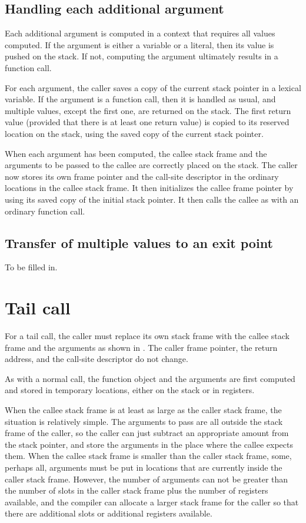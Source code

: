 \subsection{Handling each additional argument}

Each additional argument is computed in a context that requires
all values computed.  If the argument is either a variable or a
literal, then its value is pushed on the stack.  If not, computing the
argument ultimately results in a function call.  

For each argument, the caller saves a copy of the current stack
pointer in a lexical variable.  If the argument is a function call,
then it is handled as usual, and multiple values, except the first
one, are returned on the stack.  The first return value (provided that
there is at least one return value) is copied to its reserved location
on the stack, using the saved copy of the current stack pointer.

When each argument has been computed, the callee stack frame and the
arguments to be passed to the callee are correctly placed on the
stack.  The caller now stores its own frame pointer and the call-site
descriptor in the ordinary locations in the callee stack frame.  It
then initializes the callee frame pointer by using its saved copy of
the initial stack pointer.  It then calls the callee as with an
ordinary function call.

\subsection{Transfer of multiple values to an exit point}

To be filled in.

\section{Tail call}

For a tail call, the caller must replace its own stack frame with the
callee stack frame and the arguments as shown in
.  The caller frame pointer,
the return address, and the call-site descriptor do not change.

As with a normal call, the function object and the arguments are first
computed and stored in temporary locations, either on the stack or in
registers.

When the callee stack frame is at least as large as the caller stack
frame, the situation is relatively simple.  The arguments to pass are
all outside the stack frame of the caller, so the caller can just
subtract an appropriate amount from the stack pointer, and store the
arguments in the place where the callee expects them.  When the callee
stack frame is smaller than the caller stack frame, some, perhaps all,
arguments must be put in locations that are currently inside the
caller stack frame.  However, the number of arguments can not be
greater than the number of slots in the caller stack frame plus the
number of registers available, and the compiler can allocate a larger
stack frame for the caller so that there are additional slots or
additional registers available.

